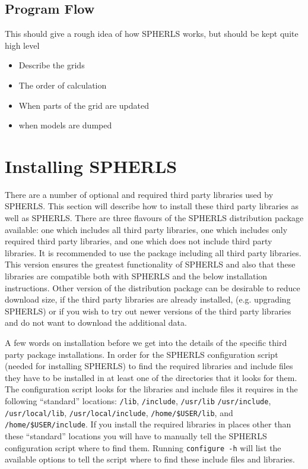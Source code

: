 \documentclass[12pt,a4paper]{book}
\begin{document}
\subsection{Program Flow}
This should give a rough idea of how SPHERLS works, but should be kept quite high level
\begin{itemize}
\item Describe the grids
\item The order of calculation
\item When parts of the grid are updated
\item when models are dumped
\end{itemize}

\section{Installing SPHERLS}

There are a number of optional and required third party libraries used by SPHERLS. This section will describe how to install these third party libraries as well as SPHERLS. There are three flavours of the SPHERLS distribution package available: one which includes all third party libraries, one which includes only required third party libraries, and one which does not include third party libraries. It is recommended to use the package including all third party libraries. This version ensures the greatest functionality of SPHERLS and also that these libraries are compatible both with SPHERLS and the below installation instructions. Other version of the distribution package can be desirable to reduce download size, if the third party libraries are already installed, (e.g. upgrading SPHERLS) or if you wish to try out newer versions of the third party libraries and do not want to download the additional data.

A few words on installation before we get into the details of the specific third party package installations. In order for the SPHERLS configuration script (needed for installing SPHERLS) to find the required libraries and include files they have to be installed in at least one of the directories that it looks for them. The configuration script looks for the libraries and include files it requires in the following ``standard'' locations: {\tt /lib}, {\tt /include}, {\tt /usr/\-lib} {\tt /usr/\-include}, {\tt /usr/local/lib}, {\tt /usr/\-local/\-include}, {\tt /home/\-\$USER/\-lib}, and {\tt /home/\-\$USER/\-include}. If you install the required libraries in places other than these ``standard'' locations you will have to manually tell the SPHERLS configuration script where to find them. Running {\tt configure -h} will list the available options to tell the script where to find these include files and libraries.
\end{document}
